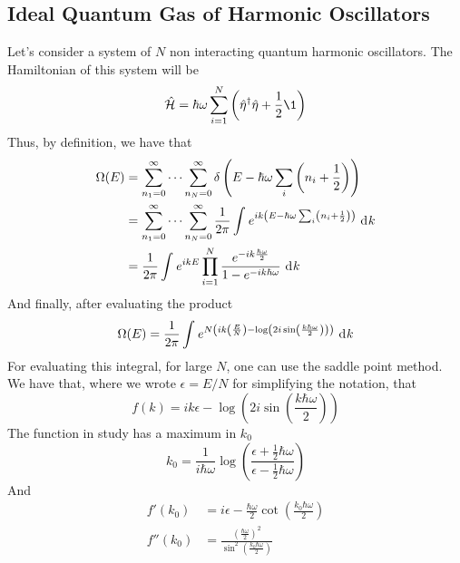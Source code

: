 \documentclass[../qm.tex]{subfiles}
\begin{document}
		\subsection{Ideal Quantum Gas of Harmonic Oscillators}
		Let's consider a system of $N$ non interacting quantum harmonic oscillators. The Hamiltonian of this system will be
		\begin{equation}
			\opr{\ham}=\hbar\omega\sum_{i=1}^N\left( \adj{\opr{\eta}}\opr{\eta}+\frac{1}{2}\1 \right)
			\label{eq:nqhohamqms}
		\end{equation}
		Thus, by definition, we have that
		\begin{equation}
		\begin{aligned}
				\Omega(E)&=\sum_{n_1=0}^{\infty}\cdots\sum_{n_N=0}^{\infty}\delta\left( E-\hbar\omega\sum_i\left( n_i+\frac{1}{2} \right) \right)\\
				&=\sum_{n_1=0}^{\infty}\cdots\sum_{n_N=0}^{\infty}\frac{1}{2\pi}\int_{}^{}e^{ik\left( E-\hbar\omega\sum_i\left( n_i+\frac{1}{2} \right) \right)}\ \mathrm{d}^{}k\\
				&=\frac{1}{2\pi}\int_{}^{}e^{ikE}\prod_{i=1}^{N}\frac{e^{-ik\frac{\hbar\omega}{2}}}{1-e^{-ik\hbar\omega}}\ \mathrm{d}^{}k
			\end{aligned}
			\label{eq:omegaeqho}
		\end{equation}
		And finally, after evaluating the product
		\begin{equation}
			\Omega(E)=\frac{1}{2\pi}\int_{}^{}e^{N\left( ik\left( \frac{E}{N} \right)-\log\left( 2i\sin\left( \frac{k\hbar\omega}{2} \right) \right) \right)}\ \mathrm{d}^{}k
			\label{eq:finalomegaeqho}
		\end{equation}
		For evaluating this integral, for large $N$, one can use the saddle point method.\\
		We have that, where we wrote $\epsilon=E/N$ for simplifying the notation, that
		\begin{equation*}
			f(k)=ik\epsilon-\log\left( 2i\sin\left( \frac{k\hbar\omega}{2} \right) \right)
		\end{equation*}
		The function in study has a maximum in $k_0$
		\begin{equation*}
			k_0=\frac{1}{i\hbar\omega}\log\left( \frac{\epsilon+\frac{1}{2}\hbar\omega}{\epsilon-\frac{1}{2}\hbar\omega} \right)
		\end{equation*}
		And
		\begin{equation*}
			\begin{aligned}
				f'(k_0)&=i\epsilon-\frac{\hbar\omega}{2}\cot\left( \frac{k_0\hbar\omega}{2} \right)\\
				f''(k_0)&=\frac{\left( \frac{\hbar\omega}{2} \right)^2}{\sin^2\left( \frac{k_0\hbar\omega}{2} \right)}
			\end{aligned}
		\end{equation*}
\end{document}
